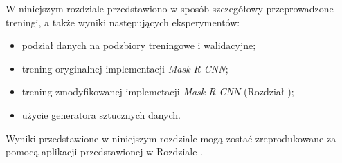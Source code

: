 
W niniejszym rozdziale przedstawiono w sposób szczegółowy przeprowadzone treningi, a także wyniki następujących eksperymentów:

\begin{itemize}
 \item podział danych na podzbiory treningowe i walidacyjne;
 \item trening oryginalnej implementacji \textit{Mask R-CNN};
 \item trening zmodyfikowanej implemetacji \textit{Mask R-CNN} (Rozdział );
 \item użycie generatora sztucznych danych.
\end{itemize}

Wyniki przedstawione w niniejszym rozdziale mogą zostać zreprodukowane za pomocą aplikacji przedstawionej w Rozdziale .
